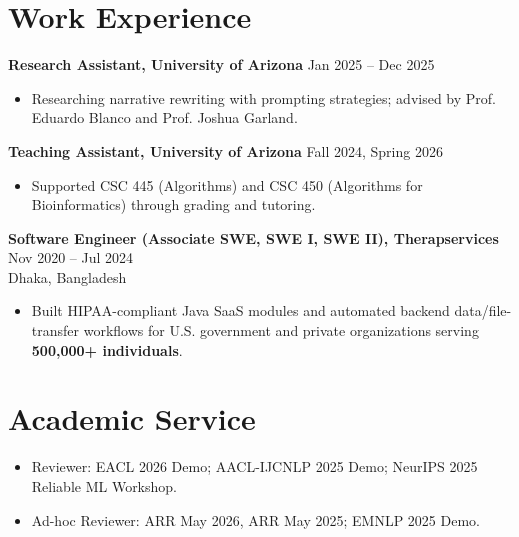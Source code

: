 \documentclass[10pt]{extarticle}
\begin{document}

\section*{Work Experience}
\textbf{Research Assistant, University of Arizona} \hfill Jan 2025 -- Dec 2025
\begin{itemize}
    \item Researching narrative rewriting with prompting strategies; advised by Prof. Eduardo Blanco and Prof. Joshua Garland.
\end{itemize}
\textbf{Teaching Assistant, University of Arizona} \hfill Fall 2024, Spring 2026
\begin{itemize}
    \item Supported {CSC 445 (Algorithms)} and {CSC 450 (Algorithms for Bioinformatics)} through grading and tutoring.
\end{itemize}
\textbf{Software Engineer (Associate SWE, SWE I, SWE II), Therapservices} \hfill Nov 2020 -- Jul 2024\\
Dhaka, Bangladesh
\begin{itemize}
    \item Built HIPAA-compliant Java SaaS modules and automated backend data/file-transfer workflows for U.S. government and private organizations serving \textbf{500,000+ individuals}.
\end{itemize}

\vspace{-1em}
\section{Academic Service}
\begin{itemize}
  \item Reviewer: EACL 2026 Demo; AACL-IJCNLP 2025 Demo; NeurIPS 2025 Reliable ML Workshop.
  \item Ad-hoc Reviewer: ARR May 2026, ARR May 2025; EMNLP 2025 Demo.
\end{itemize}
\end{document}
